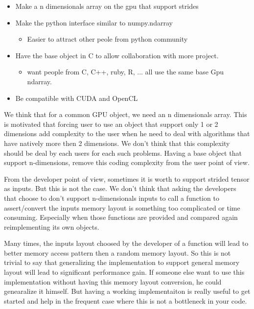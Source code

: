 \documentclass{article} %
\begin{document}
\begin{itemize}
\item Make a n dimensionals array on the gpu that support strides
\item Make the python interface similar to numpy.ndarray
  \begin{itemize}
  \item Easier to attract other peole from python community
  \end{itemize}
\item Have the base object in C to allow collaboration with more project.
  \begin{itemize}
  \item  want people from C, C++, ruby, R, ... all use the same base Gpu ndarray.
  \end{itemize}
\item Be compatible with CUDA and OpenCL
\end{itemize}


We think that for a common GPU object, we need an n dimensionals
array. This is motivated that forcing user to use an object that
support only 1 or 2 dimensions add complexity to the user when he need
to deal with algorithms that have natively more then 2 dimensions. We
don't think that this complexity should be deal by each users for each
such problems. Having a base object that support n-dimensions, remove
this coding complexity from the user point of view.

From the developer point of view, sometimes it is worth to support
strided tensor as inputs. But this is not the case. We don't think
that asking the developers that choose to don't support n-dimensionals
inputs to call a function to assert/convert the inputs memory layout
is something too complicated or time consuming. Especially when those
functions are provided and compared again reimplementing its own objects.

Many times, the inputs layout choosed by the developer of a function
will lead to better memory access pattern then a random memory
layout. So this is not trivial to say that generalizing the
implementation to support general memory layout will lead to
significant performance gain. If someone else want to use this
implementation without having this memory layout conversion, he could
genearalize it himself. But having a working implementaiton is really
useful to get started and help in the frequent case where this is not a
bottleneck in your code.
\end{document}
